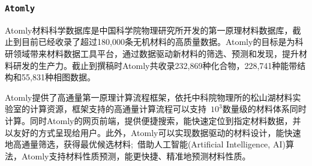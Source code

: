 \subsubsection{\tt{Atomly}}
\textrm{Atomly}材料科学数据库\cite{ATOMLY_URL}是中国科学院物理研究所开发的第一原理材料数据库，截止到目前已经收录了超过180,000条无机材料的高质量数据。\textrm{Atomly}的目标是为科研领域带来材料数据工具平台，通过数据驱动新材料的筛选、预测和发现，提升材料研发的生产力。截止到撰稿时\textrm{Atomly}共收录232,869种化合物，228,741种能带结构和55,831种相图数据。

\textrm{Atomly}提供了高通量第一原理计算流程框架\cite{arXiv2108_00359v1}，依托中科院物理所的松山湖材料实验室的计算资源，框架支持的高通量计算流程可以支持~$10^3$数量级的材料体系同时计算。同时\textrm{Atomly}的网页前端，提供便捷搜索，能快速定位到指定材料数据，并以友好的方式呈现给用户。此外，\textrm{Atomly}可以实现数据驱动的材料设计，能快速地高通量筛选，获得最优候选材料;~借助人工智能\textrm{(Artificial Intelligence, AI)}算法，\textrm{Atomly}支持材料性质预测，能更快捷、精准地预测材料性质。
